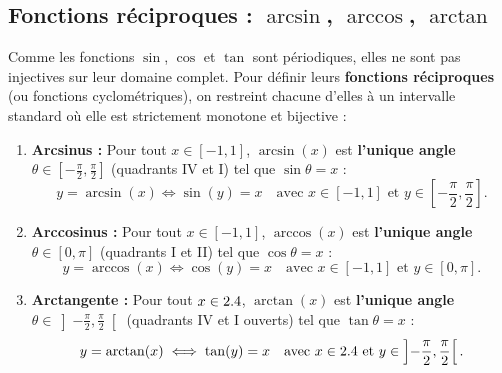 \begin{center}
\end{center}

\subsection{Fonctions réciproques : $\arcsin$, $\arccos$, $\arctan$}

Comme les fonctions $\sin$, $\cos$ et $\tan$ sont périodiques, elles ne sont pas injectives sur leur domaine complet. Pour définir leurs \textbf{fonctions réciproques} (ou fonctions cyclométriques), on restreint chacune d'elles à un intervalle standard où elle est strictement monotone et bijective :

\begin{definition}
\begin{enumerate}
    \item \textbf{Arcsinus :} Pour tout $x \in [-1, 1]$, $\arcsin(x)$ est \textbf{l'unique angle $\theta \in \left[-\frac{\pi}{2}, \frac{\pi}{2}\right]$} (quadrants IV et I) tel que $\sin\theta = x$ :
    \[
        y = \arcsin(x) \iff \sin(y) = x \quad \text{avec } x \in [-1, 1] \text{ et } y \in \left[-\frac{\pi}{2}, \frac{\pi}{2}\right].
    \]
    \item \textbf{Arccosinus :} Pour tout $x \in [-1, 1]$, $\arccos(x)$ est \textbf{l'unique angle $\theta \in [0, \pi]$} (quadrants I et II) tel que $\cos\theta = x$ :
    \[
        y = \arccos(x) \iff \cos(y) = x \quad \text{avec } x \in [-1, 1] \text{ et } y \in [0, \pi].
    \]
    \item \textbf{Arctangente :} Pour tout $x \in 2.4$, $\arctan(x)$ est \textbf{l'unique angle $\theta \in \left]-\frac{\pi}{2}, \frac{\pi}{2}\right[$} (quadrants IV et I ouverts) tel que $\tan\theta = x$ :
    \[
        y = \arctan(x) \iff \tan(y) = x \quad \text{avec } x \in 2.4 \text{ et } y \in \left]-\frac{\pi}{2}, \frac{\pi}{2}\right[.
    \]
\end{enumerate}
\end{definition}

